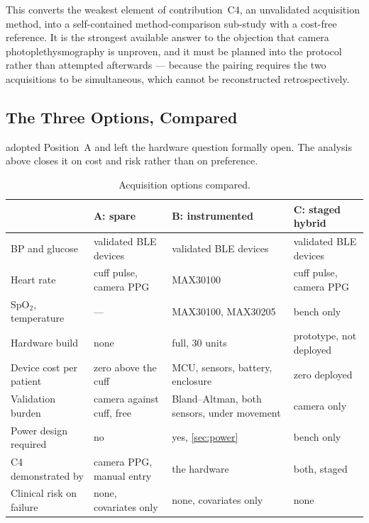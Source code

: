 \documentclass[12pt,a4paper,oneside]{report}
\begin{document}
This converts the weakest element of contribution~C4, an unvalidated acquisition method, into a self-contained method-comparison sub-study with a cost-free reference. It is the strongest available answer to the objection that camera photoplethysmography is unproven, and it must be planned into the protocol rather than attempted afterwards --- because the pairing requires the two acquisitions to be simultaneous, which cannot be reconstructed retrospectively.

\subsection{The Three Options, Compared}\label{sec:options}

 adopted Position~A and left the hardware question formally open. The analysis above closes it on cost and risk rather than on preference.

\begin{table}[htbp]
\centering\footnotesize
\caption{Acquisition options compared.}\label{tab:options}
\begin{tabularx}{\textwidth}{@{}>{\raggedright\arraybackslash}p{3.0cm} >{\raggedright\arraybackslash}p{3.0cm} >{\raggedright\arraybackslash}p{3.2cm} X@{}}
\toprule
 & \textbf{A: spare} & \textbf{B: instrumented} & \textbf{C: staged hybrid} \\
\midrule
BP and glucose & validated BLE devices & validated BLE devices & validated BLE devices \\
Heart rate & cuff pulse, camera PPG & MAX30100 & cuff pulse, camera PPG \\
SpO$_2$, temperature & --- & MAX30100, MAX30205 & bench only \\
Hardware build & none & full, 30 units & prototype, not deployed \\
Device cost per patient & zero above the cuff & MCU, sensors, battery, enclosure & zero deployed \\
Validation burden & camera against cuff, free & Bland--Altman, both sensors, under movement & camera only \\
Power design required & no & yes, \cref{sec:power} & bench only \\
C4 demonstrated by & camera PPG, manual entry & the hardware & both, staged \\
Clinical risk on failure & none, covariates only & none, covariates only & none \\
\bottomrule
\end{tabularx}
\end{table}
\end{document}
